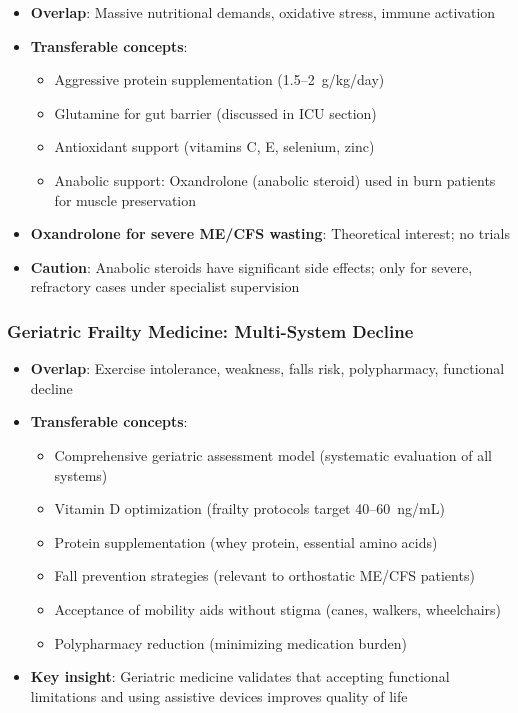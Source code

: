 \begin{itemize}
    \item \textbf{Overlap}: Massive nutritional demands, oxidative stress, immune activation
    \item \textbf{Transferable concepts}:
    \begin{itemize}
        \item Aggressive protein supplementation (1.5--2~g/kg/day)
        \item Glutamine for gut barrier (discussed in ICU section)
        \item Antioxidant support (vitamins C, E, selenium, zinc)
        \item Anabolic support: Oxandrolone (anabolic steroid) used in burn patients for muscle preservation
    \end{itemize}
    \item \textbf{Oxandrolone for severe ME/CFS wasting}: Theoretical interest; no trials
    \item \textbf{Caution}: Anabolic steroids have significant side effects; only for severe, refractory cases under specialist supervision
\end{itemize}

\subsubsection{Geriatric Frailty Medicine: Multi-System Decline}

\begin{itemize}
    \item \textbf{Overlap}: Exercise intolerance, weakness, falls risk, polypharmacy, functional decline
    \item \textbf{Transferable concepts}:
    \begin{itemize}
        \item Comprehensive geriatric assessment model (systematic evaluation of all systems)
        \item Vitamin D optimization (frailty protocols target 40--60~ng/mL)
        \item Protein supplementation (whey protein, essential amino acids)
        \item Fall prevention strategies (relevant to orthostatic ME/CFS patients)
        \item Acceptance of mobility aids without stigma (canes, walkers, wheelchairs)
        \item Polypharmacy reduction (minimizing medication burden)
    \end{itemize}
    \item \textbf{Key insight}: Geriatric medicine validates that accepting functional limitations and using assistive devices improves quality of life
\end{itemize}

